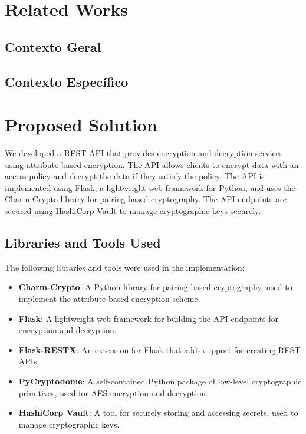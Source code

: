 \documentclass[cic,tc,english]{iiufrgs}
\begin{document}
\chapter{Related Works}
    \section{Contexto Geral}
    \section{Contexto Específico}

\chapter{Proposed Solution}
    \label{proposedsolution}
    We developed a REST API that provides encryption and decryption services using attribute-based encryption. The API allows clients to encrypt data with an access policy and decrypt the data if they satisfy the policy. The API is implemented using Flask, a lightweight web framework for Python, and uses the Charm-Crypto library for pairing-based cryptography. The API endpoints are secured using HashiCorp Vault to manage cryptographic keys securely.

    \section{Libraries and Tools Used}

    The following libraries and tools were used in the implementation:

    \begin{itemize}
        \item \textbf{Charm-Crypto}: A Python library for pairing-based cryptography, used to implement the attribute-based encryption scheme.
        \item \textbf{Flask}: A lightweight web framework for building the API endpoints for encryption and decryption.
        \item \textbf{Flask-RESTX}: An extension for Flask that adds support for creating REST APIs.
        \item \textbf{PyCryptodome}: A self-contained Python package of low-level cryptographic primitives, used for AES encryption and decryption.
        \item \textbf{HashiCorp Vault}: A tool for securely storing and accessing secrets, used to manage cryptographic keys.
    \end{itemize}
\end{document}
